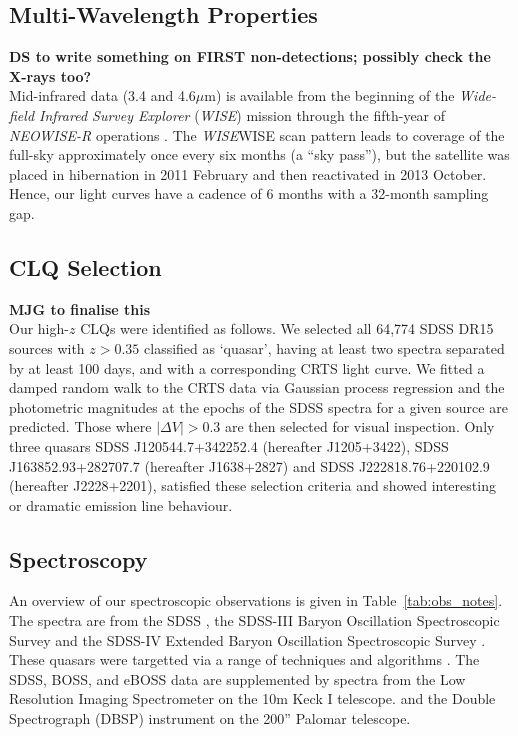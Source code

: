 \documentclass[fleqn,usenatbib]{mnras}
\begin{document}
\subsection{Multi-Wavelength Properties}
{\bf DS to write something on FIRST non-detections; possibly check the X-rays too?} \\
Mid-infrared data (3.4 and 4.6$\mu$m) is available from the beginning
of the {\it Wide-field Infrared Survey Explorer} ({\it WISE}) mission
\citep[2010 January; ][]{Wright2010} through the fifth-year of {\it
NEOWISE-R} operations \citep[2018 December; ][]{Mainzer2011}. The {\it
WISE}WISE scan pattern leads to coverage of the full-sky approximately
once every six months (a ``sky pass''), but the satellite was placed
in hibernation in 2011 February and then reactivated in 2013
October. Hence, our light curves have a cadence of 6 months with a
32-month sampling gap.


\subsection{CLQ Selection}
{\bf MJG to finalise this} \\
Our high-$z$ CLQs were identified as follows.  We selected all 64,774
SDSS DR15 sources with $z > 0.35$ classified as `quasar', having at least
two spectra separated by at least 100 days, and with a corresponding
CRTS light curve. We fitted a damped random walk to the CRTS data via
Gaussian process regression and the photometric magnitudes at the
epochs of the SDSS spectra for a given source are predicted. Those
where $|\Delta V| > 0.3$ are then selected for visual
inspection. Only three quasars SDSS J120544.7+342252.4 (hereafter
J1205+3422), SDSS J163852.93+282707.7 (hereafter J1638+2827) and SDSS
J222818.76+220102.9 (hereafter J2228+2201), satisfied these selection
criteria and showed interesting or dramatic emission line behaviour.





\subsection{Spectroscopy}
An overview of our spectroscopic observations is given in
Table~\ref{tab:obs_notes}.  The spectra are from the SDSS
\citep{Stoughton2002, DR7, Schneider2010}, the SDSS-III Baryon
Oscillation Spectroscopic Survey \citep[BOSS; ][]{Eisenstein2011,
Dawson2013, Smee2013, Alam2015, Paris2017} and the SDSS-IV Extended
Baryon Oscillation Spectroscopic Survey \citep[eBOSS; ][]{Dawson2016,
Abolfathi2018, Paris2018}.  These quasars were targetted via a range
of techniques and algorithms \citep[see ][]{Richards2002, Ross2012,
Myers2015}. The SDSS, BOSS, and eBOSS data are supplemented by spectra
from the Low Resolution Imaging Spectrometer \citep[LRIS; ][]{Oke1995}
on the 10m Keck {\sc I} telescope.  and the Double Spectrograph (DBSP)
instrument on the 200'' Palomar telescope.
\end{document}
